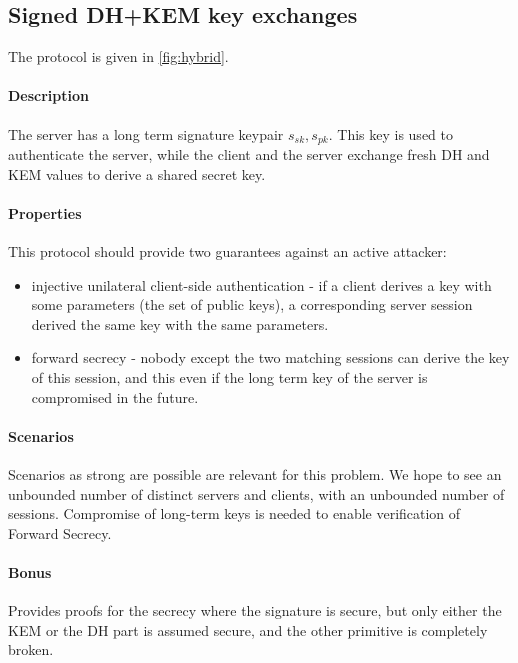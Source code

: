 \documentclass{article}
\newcommand{\sfsk}{\mathit{sk}}
\newcommand{\sfpk}{\mathit{pk}}
\begin{document}
\subsection{Signed DH+KEM key exchanges}\label{prob:hybrid}

The protocol is given in \cref{fig:hybrid}.

 \paragraph{Description} The server has a long term signature keypair $s_\sfsk,s_\sfpk$. 
This key is used to authenticate the server, while the client and the server exchange fresh DH and KEM values to derive a shared secret key.

\paragraph{Properties} This protocol should provide two guarantees against an active attacker:
\begin{itemize}
\item injective unilateral client-side authentication - if a client derives a key with some parameters (the set of public keys), a corresponding server session derived the same key with the same parameters.
\item forward secrecy - nobody except the two matching sessions can derive the key of this session, and this even if the long term key of the server is compromised in the future.
\end{itemize}

\paragraph{Scenarios} Scenarios as strong are possible are relevant for this problem. We hope to see an unbounded number of distinct servers and clients, with an unbounded number of sessions. Compromise of long-term keys is needed to enable verification of Forward Secrecy.  

\paragraph{Bonus} Provides proofs for the secrecy where the signature is secure, but only either the KEM or the DH part is assumed secure, and the other primitive is completely broken.
\end{document}
